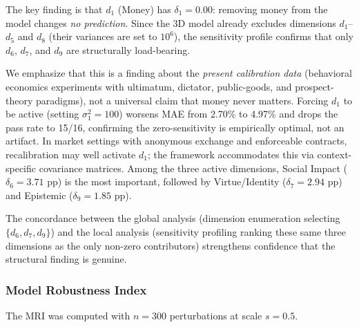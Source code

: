\documentclass[manuscript,review,anonymous]{acmart}
\begin{document}
The key finding is that $d_1$ (Money) has $\delta_1 = 0.00$: removing money from the model changes \emph{no prediction}.
Since the 3D model already excludes dimensions $d_1$--$d_5$ and $d_8$ (their variances are set to $10^6$), the sensitivity profile confirms that only $d_6$, $d_7$, and $d_9$ are structurally load-bearing.

We emphasize that this is a finding about the \emph{present calibration data} (behavioral economics experiments with ultimatum, dictator, public-goods, and prospect-theory paradigms), not a universal claim that money never matters.
Forcing $d_1$ to be active (setting $\sigma_1^2 = 100$) worsens MAE from 2.70\% to 4.97\% and drops the pass rate to 15/16, confirming the zero-sensitivity is empirically optimal, not an artifact.
In market settings with anonymous exchange and enforceable contracts, recalibration may well activate $d_1$; the framework accommodates this via context-specific covariance matrices.
Among the three active dimensions, Social Impact ($\delta_6 = 3.71$ pp) is the most important, followed by Virtue/Identity ($\delta_7 = 2.94$ pp) and Epistemic ($\delta_9 = 1.85$ pp).

The concordance between the global analysis (dimension enumeration selecting $\{d_6, d_7, d_9\}$) and the local analysis (sensitivity profiling ranking these same three dimensions as the only non-zero contributors) strengthens confidence that the structural finding is genuine.

\subsubsection{Model Robustness Index}

The MRI was computed with $n = 300$ perturbations at scale $s = 0.5$.
\end{document}
